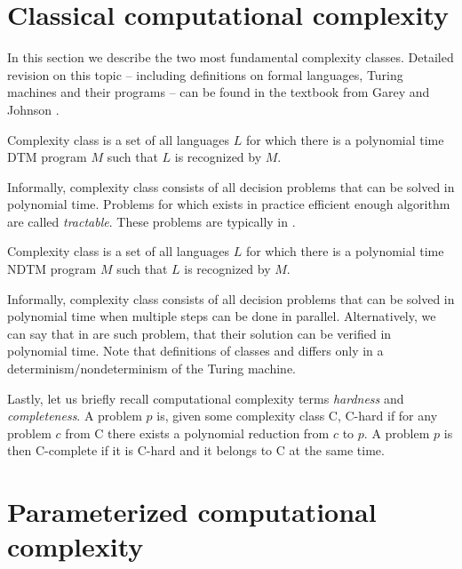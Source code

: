 \section{Classical computational complexity}

In this section we describe the two most fundamental complexity classes.
Detailed revision on this topic --
including definitions on formal languages, Turing machines and their programs --
can be found in the textbook from Garey and Johnson \cite{Garey1990}. 

\begin{definition}[\Po]
    Complexity class \Po is a set of all languages $L$ for which there is a polynomial time DTM program $M$
    such that $L$ is recognized by $M$.
\end{definition}
Informally, complexity class \Po consists of all decision problems that can be solved in polynomial time.
Problems for which exists in practice efficient enough algorithm are called \emph{tractable}.
These problems are typically in \Po.

\begin{definition}[\NP]
    Complexity class \NP is a set of all languages $L$ for which there is a polynomial time NDTM program $M$
    such that $L$ is recognized by $M$.
\end{definition}
Informally, complexity class \NP consists of all decision problems that can be solved in polynomial time
when multiple steps can be done in parallel.
Alternatively, we can say that in \NP are such problem, that their solution can be verified in polynomial time.
Note that definitions of classes \Po and \NP differs only in a determinism/nondeterminism of the Turing machine.

Lastly, let us briefly recall computational complexity terms \emph{hardness} and \emph{completeness}.
A problem $p$ is, given some complexity class \textsf{C}, \textsf{C-hard} if for any problem $c$ from \textsf{C}
there exists a polynomial reduction from $c$ to $p$.
A problem $p$ is then \textsf{C-complete} if it is \textsf{C-hard} and it belongs to \textsf{C} at the same time.


\section{Parameterized computational complexity}\label{section:ParamComp}


